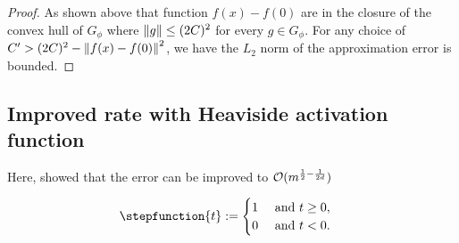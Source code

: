 \begin{proof}
    As shown above that function $f(x) - f(0)$ are in the closure of the convex
    hull of $G_{\phi}$ where $\left\| g \right\| \leq (2C)^2$ for every $g \in G_{\phi}$.
    For any choice of $C' > (2C)^2 - \left\| f(x) - f(0) \right\|^2$, we have the $L_2$
    norm of the approximation error is bounded.




\end{proof}



\subsection{Improved rate with Heaviside activation function}



Here, \cite{makovozRandomApproximantsNeural1996} showed that the error can be
improved to $\mathcal{O}(m^{\frac{1}{2} - \frac{1}{2d}})$

\begin{definition}
    \begin{equation}
        \stepfunction{t} := 
        \begin{cases}
            1 \quad \text{ and } t \geq 0,\\
            0 \quad \text{ and } t < 0.
        \end{cases}
    \end{equation}
\end{definition}


